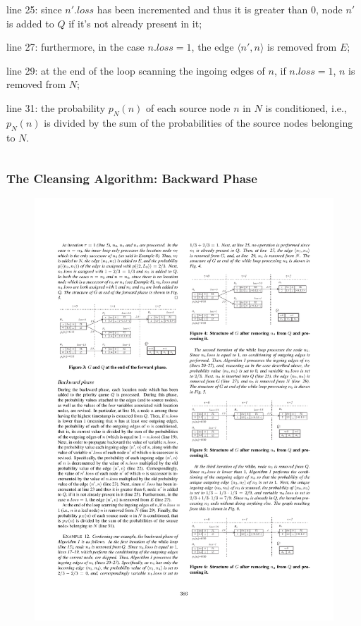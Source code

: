 \begin{frame}
\begin{columns}
  \begin{sitemize}
    \item line 25: since $n'.loss$ has been incremented and thus it is greater than 0, node $n'$ is added to $Q$ if it's not already present in it;
    \item line 27: furthermore, in the case $n.loss = 1$, the edge $\langle n',n \rangle$ is removed from $E$;
    \item line 29: at the end of the loop scanning the ingoing edges of $n$, if $n.loss = 1$, $n$ is removed from $N$;
    \item line 31: the probability $p_N(n)$ of each source node $n$ in $N$ is conditioned, i.e., $p_N(n)$ is divided by the sum of the probabilities of the source nodes belonging to $N$.
  \end{sitemize}

\end{columns}


\end{frame}


\begin{frame}
\frametitle{The Cleansing Algorithm: Backward Phase}

\begin{figure}[tb]
  \includegraphics[width=0.5\columnwidth]{figures/3-4/3-4-9.pdf}
\end{figure}

\vspace{-15pt}

\begin{example}
\end{example}

\end{frame}
